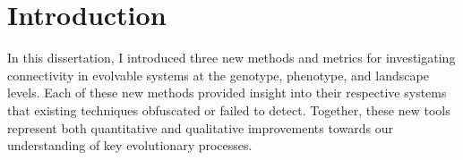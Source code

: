 \section{Introduction}

In this dissertation, I introduced three new methods and metrics for investigating connectivity in evolvable systems at the genotype, phenotype, and landscape levels. 
Each of these new methods provided insight into their respective systems that existing techniques obfuscated or failed to detect. 
Together, these new tools represent both quantitative and qualitative improvements towards our understanding of key evolutionary processes.